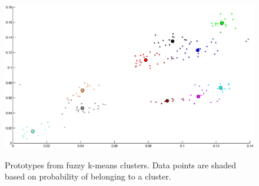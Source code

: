 \begin{figure}
\includegraphics[width=\textwidth]{images/fuzzy-gradient}
\label{fig:k-means-gradientfuzz}
\caption{Prototypes from fuzzy k-means clusters. Data points are
shaded based on probability of belonging to a cluster.}
\end{figure}